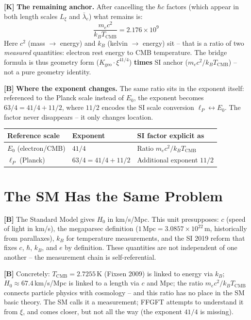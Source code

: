 \textbf{[K]} \textbf{The remaining anchor.} After cancelling the $\hbar c$ factors
(which appear in both length scales $L_\xi$ and $\bar\lambda_e$) what remains is:
\[
  \boxed{\;\frac{m_ec^2}{k_BT_\text{CMB}} = 2{.}176\times10^9\;}
\]
Here $c^2$ (mass $\to$ energy) and $k_B$ (kelvin $\to$ energy) sit -- that is a
ratio of two \emph{measured} quantities: electron rest energy to CMB temperature.
The bridge formula is thus geometry form ($K_\text{geo}\cdot\xi^{41/4}$) \textbf{times}
SI anchor ($m_ec^2/k_BT_\text{CMB}$) -- not a pure geometry identity.

\textbf{[B]} \textbf{Where the exponent changes.} The same ratio sits in the
exponent itself: referenced to the Planck scale instead of $E_0$, the exponent
becomes $63/4=41/4+11/2$, where $11/2$ encodes the SI scale conversion
$\ell_P\leftrightarrow E_0$. The factor never disappears -- it only changes location.

\begin{center}
\renewcommand{\arraystretch}{1.3}
{\small
\begin{tabular}{lll}
\toprule
Reference scale & Exponent & SI factor explicit as \\
\midrule
$E_0$ (electron/CMB) & $41/4$ & Ratio $m_ec^2/k_BT_\text{CMB}$ \\
$\ell_P$ (Planck)    & $63/4 = 41/4+11/2$ & Additional exponent $11/2$ \\
\bottomrule
\end{tabular}
}
\renewcommand{\arraystretch}{1.0}
\end{center}

\section{The SM Has the Same Problem}

\textbf{[B]} The Standard Model gives $H_0$ in km/s/Mpc. This unit presupposes:
$c$ (speed of light in km/s), the megaparsec definition
($1\,\text{Mpc}=3{.}0857\times10^{22}\,\text{m}$, historically from parallaxes),
$k_B$ for temperature measurements, and the SI 2019 reform that fixes $c$, $\hbar$,
$k_B$, and $e$ by definition. These quantities are not independent of one another
-- the measurement chain is self-referential.

\textbf{[B]} Concretely: $T_\text{CMB}=2{.}7255\,$K (Fixsen 2009) is linked to
energy via $k_B$; $H_0\approx67{.}4\,$km/s/Mpc is linked to a length via $c$ and
Mpc; the ratio $m_ec^2/k_BT_\text{CMB}$ connects particle physics with cosmology
-- and this ratio has no place in the SM basic theory. The SM calls it a
measurement; FFGFT attempts to understand it from $\xi$, and comes closer, but
not all the way (the exponent $41/4$ is missing).

